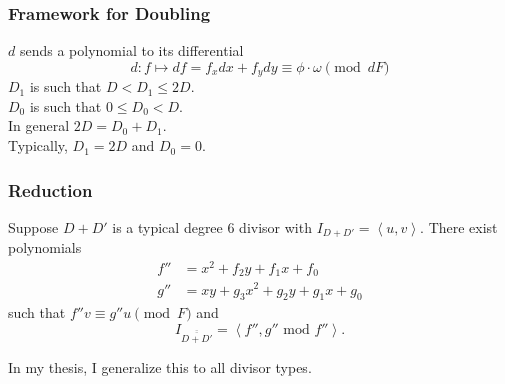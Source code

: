 \documentclass{beamer}
\newcommand{\pid}[1]{\left\langle #1 \right\rangle}
\DeclareMathOperator{\im}{im}
\renewcommand{\bar}{\overline}
\begin{document}

\begin{frame}[fragile]
\frametitle{Framework for Doubling}
  \begin{center}
  \end{center}
  $d$ sends a polynomial to its differential
  \[ d : f \mapsto df = f_xdx + f_ydy \equiv \phi \cdot \omega \pmod{dF} \]
  $D_1$ is such that $D < D_1 \leq 2D$. \\
  $D_0$ is such that $0 \leq D_0 < D$. \\
  In general $2D = D_0 + D_1$. \\
  Typically, $D_1 = 2D$ and $D_0 = 0$.
\end{frame}


\begin{frame}
\frametitle{Reduction}
  \begin{theorem}
    Suppose $D + D'$ is a typical degree 6 divisor with $I_{D + D'} = \pid{u,v}$.
    There exist polynomials
    \begin{align*}
      f'' &= x^2 + f_2y + f_1x + f_0 \\
      g'' &= xy + g_3x^2 + g_2y + g_1x + g_0
    \end{align*}
    such that $f''v \equiv g''u \pmod F$ and
    \[ I_{\bar{\bar{D + D'}}} = \pid{f'', g'' \text{ mod } f''}. \]
  \end{theorem}
  In my thesis, I generalize this to all divisor types.
\end{frame}

\end{document}
